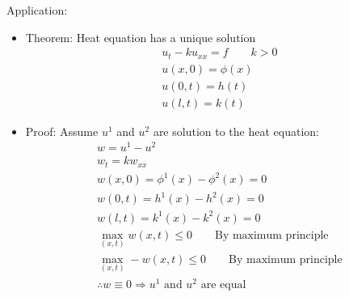 \documentclass[12pt, a4paper]{article}
\begin{document}
Application:
\begin{itemize}
    \item Theorem: Heat equation has a unique solution
    \begin{gather*}
        u_t - ku_{xx} = f \qquad k > 0\\
        u(x, 0) = \phi(x)\\
        u(0, t) = h(t)\\
        u(l, t) = k(t)
    \end{gather*}
    \item Proof: Assume $u^1$ and $u^2$ are solution to the heat equation:
    \begin{gather*}
        w = u^1 - u^2\\
        w_t = kw_{xx}\\
        w(x, 0) = \phi^1(x) - \phi^2(x) = 0\\
        w(0, t) = h^1(x) - h^2(x) = 0\\
        w(l, t) = k^1(x) - k^2(x) = 0\\
        \max_{(x, t)} w(x, t) \leq 0 \qquad \text{By maximum principle}\\
        \max_{(x, t)} -w(x, t) \leq 0 \qquad \text{By maximum principle}\\
        \therefore w \equiv 0 \Rightarrow \text{$u^1$ and $u^2$ are equal}
    \end{gather*}
    
\end{itemize}
\vspace{0.3em}
\end{document}
